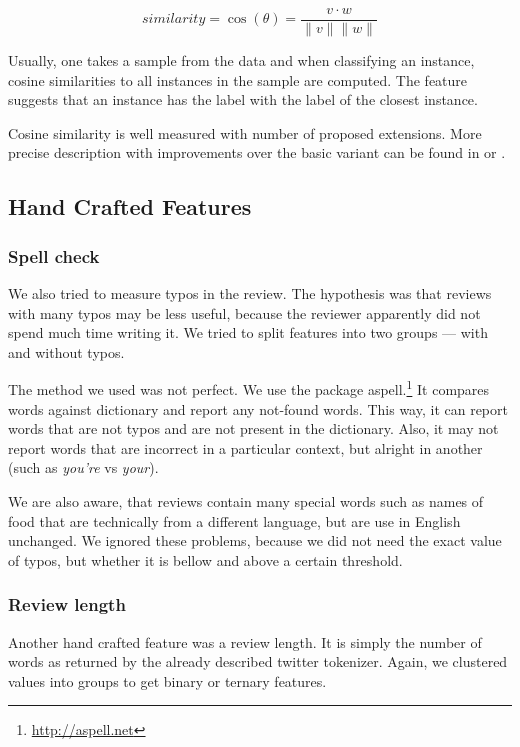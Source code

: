 \[
	\mathit{similarity} = \cos\left(\theta\right) = \frac{v \cdot w}{\|v\| \| w \|}
\]

Usually, one takes a sample from the data and when classifying an instance,
cosine similarities to all instances in the sample are computed.
The feature suggests that an instance has the label with the label of the closest instance.

Cosine similarity is well measured with number of proposed extensions.
More precise description with improvements over the basic variant can be found
in \citet{li2013distance} or \citet{mikawa2011proposal}.


\subsection{Hand Crafted Features}

\subsubsection{Spell check}

We also tried to measure typos in the review.
The hypothesis was that reviews with many typos may be less useful,
because the reviewer apparently did not spend much time writing it.
We tried to split features into two groups --- with and without typos.

The method we used was not perfect.
We use the package aspell.\footnote{\url{http://aspell.net}}
It compares words against dictionary and report any not-found words.
This way, it can report words that are not typos and are not present in the dictionary.
Also, it may not report words that are incorrect in a particular context,
but alright in another (such as \textit{you're} vs \textit{your}).

We are also aware, that reviews contain many special words such as names of food that
are technically from a different language, but are use in English unchanged.
We ignored these problems,
because we did not need the exact value of typos,
but whether it is bellow and above a certain threshold.


\subsubsection{Review length}

Another hand crafted feature was a review length.
It is simply the number of words as returned by the already described twitter tokenizer.
Again, we clustered values into groups to get binary or ternary features.


